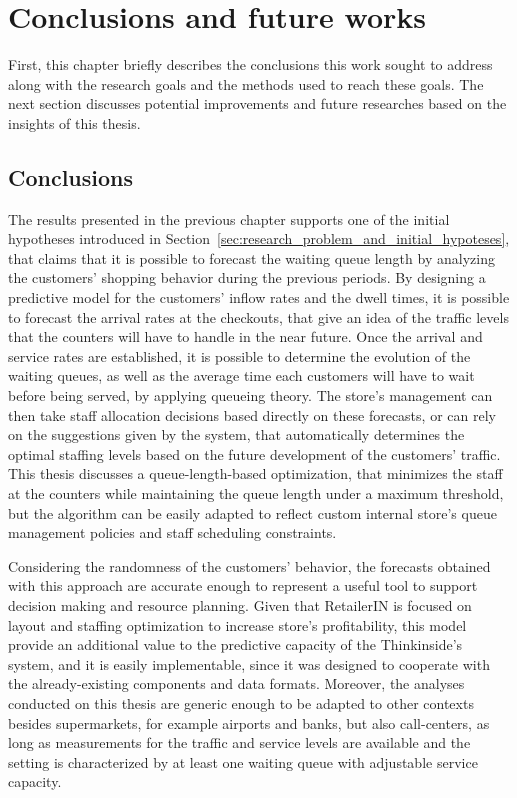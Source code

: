 \chapter{Conclusions and future works}
\label{cha:conclusions_and_future_works}

First, this chapter briefly describes the conclusions this work sought to address along with the research goals and the methods used to reach these goals. The next section discusses potential improvements and future researches based on the insights of this thesis.

\section{Conclusions}
\label{sec:conclusions}

The results presented in the previous chapter supports one of the initial hypotheses introduced in Section~\ref{sec:research_problem_and_initial_hypoteses}, that claims that it is possible to forecast the waiting queue length by analyzing the customers’ shopping behavior during the previous periods. By designing a predictive model for the customers’ inflow rates and the dwell times, it is possible to forecast the arrival rates at the checkouts, that give an idea of the traffic levels that the counters will have to handle in the near future. Once the arrival and service rates are established, it is possible to determine the evolution of the waiting queues, as well as the average time each customers will have to wait before being served, by applying queueing theory. The store’s management can then take staff allocation decisions based directly on these forecasts, or can rely on the suggestions given by the system, that automatically determines the optimal staffing levels based on the future development of the customers' traffic. This thesis discusses a queue-length-based optimization, that minimizes the staff at the counters while maintaining the queue length under a maximum threshold, but the algorithm can be easily adapted to reflect custom internal store’s queue management policies and staff scheduling constraints.

Considering the randomness of the customers’ behavior, the forecasts obtained with this approach are accurate enough to represent a useful tool to support decision making and resource planning. Given that RetailerIN is focused on layout and staffing optimization to increase store’s profitability, this model provide an additional value to the predictive capacity of the Thinkinside’s system, and it is easily implementable, since it was designed to cooperate with the already-existing components and data formats. Moreover, the analyses conducted on this thesis are generic enough to be adapted to other contexts besides supermarkets, for example airports and banks, but also call-centers, as long as measurements for the traffic and service levels are available and the setting is characterized by at least one waiting queue with adjustable service capacity.

